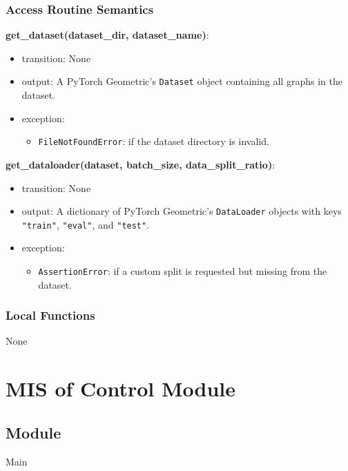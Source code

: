 \documentclass[12pt, titlepage]{article}
\begin{document}
\subsubsection{Access Routine Semantics}

\noindent \textbf{get\_dataset(dataset\_dir, dataset\_name)}:
\begin{itemize}
  \item transition: None
  \item output: A PyTorch Geometric's \texttt{Dataset} object containing all graphs in the dataset.
  \item exception:
  \begin{itemize}
    \item \texttt{FileNotFoundError}: if the dataset directory is invalid.
  \end{itemize}
\end{itemize}

\noindent \textbf{get\_dataloader(dataset, batch\_size, data\_split\_ratio)}:
\begin{itemize}
  \item transition: None
  \item output: A dictionary of PyTorch Geometric's \texttt{DataLoader} objects with keys \texttt{"train"}, \texttt{"eval"}, and \texttt{"test"}.
  \item exception:
  \begin{itemize}
    \item \texttt{AssertionError}: if a custom split is requested but missing from the dataset.
  \end{itemize}
\end{itemize}

\subsubsection{Local Functions}
None










\section{MIS of Control Module} \label{Control}

\subsection{Module}
Main
\end{document}
